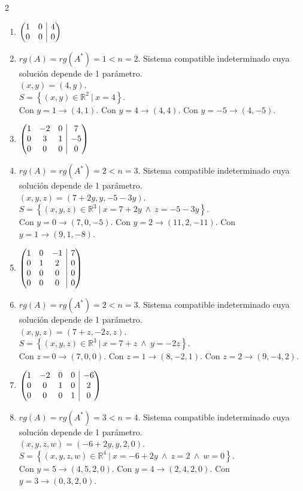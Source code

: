 \documentclass[a4paper]{article}
\makeatletter
\newcommand{\answer}{\item[**]}
\newenvironment{amatrix}[1]{%
  \left(\begin{array}{@{}*{#1}{c}|c@{}}
}{%
  \end{array}\right)
}
\makeatother
\begin{document}
\begin{enumerate}
\begin{multicols}{2}
\begin{enumerate} [label=(\alph*)]
		\item $\begin{amatrix}{2} 1 & 0 & 4 \\ 0 & 0 & 0 \end{amatrix}$
		\answer $rg(A)=rg(A^*)=1 < n=2$. Sistema compatible indeterminado cuya solución depende de 1 parámetro. \\ $(x,y)=(4,y)$. \\ $S=\left\{(x,y)\in \mathbb{R}^2 ~|~ x=4 \right\}$. \\ Con $y=1 \to (4,1)$. Con $y=4 \to (4,4)$. Con $y=-5 \to (4,-5)$. 

		\item $\begin{amatrix}{3} 1 & -2 & 0 & 7 \\ 0 & 3 & 1 & -5 \\ 0 & 0 & 0 & 0 \end{amatrix}$
		\answer $rg(A)=rg(A^*)=2<n=3$. Sistema compatible indeterminado cuya solución depende de 1 parámetro. \\ $(x,y,z)=(7+2y,y,-5-3y)$. \\ $S=\left\{(x,y,z)\in \mathbb{R}^3 ~|~ x=7+2y ~\land~ z=-5-3y \right\}$. \\ Con $y=0 \to (7,0,-5)$. Con $y=2 \to (11,2,-11)$. Con $y=1 \to (9,1,-8)$.   
		
		\item $\begin{amatrix}{3} 1 & 0 & -1 & 7 \\ 0 & 1 & 2 & 0 \\ 0 & 0 & 0 & 0 \\ 0 & 0 & 0 & 0 \end{amatrix}$
		\answer $rg(A)=rg(A^*)=2<n=3$. Sistema compatible indeterminado cuya solución depende de 1 parámetro. \\ $(x,y,z)=(7+z,-2z,z)$. \\ $S=\left\{(x,y,z)\in \mathbb{R}^3 ~|~ x=7+z ~\land~ y=-2z \right\}$. \\ Con $z=0 \to (7,0,0)$. Con $z=1 \to (8,-2,1)$. Con $z=2 \to (9,-4,2)$. 

		\item $\begin{amatrix}{4} 1 & -2 & 0 & 0 & -6 \\ 0 & 0 & 1 & 0 & 2 \\ 0 & 0 & 0 & 1 & 0 \end{amatrix}$
		\answer $rg(A)=rg(A^*)=3<n=4$. Sistema compatible indeterminado cuya solución depende de 1 parámetro. \\ $(x,y,z,w)=(-6+2y,y,2,0)$. \\ $S=\left\{(x,y,z,w)\in \mathbb{R}^4 ~|~ x=-6+2y ~\land~ z=2 ~\land~ w=0 \right\}$. \\ Con $y=5 \to (4,5,2,0)$. Con $y=4 \to (2,4,2,0)$. Con $y=3 \to (0,3,2,0)$.


\end{enumerate}
\end{multicols}
\end{enumerate}
\end{document}
